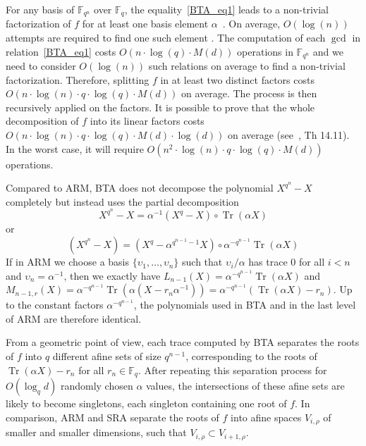 \documentclass{sig-alternate}
\newcommand{\ff}[1]{\mathbb{F}_{#1}}
\newcommand{\fq}{\ff{q}}
\newcommand{\dd}{d}
\newcommand{\qq}{q}
\newcommand{\nn}{n}
\newcommand{\qn}{{\qq^\nn}}
\newcommand{\basef}{\ff{\qq}}
\newcommand{\extf}{\ff{\qn}}
\DeclareMathOperator{\Tr}{Tr}
\newcommand{\bigO}{O}
\newcounter{algo}
\newtheorem{Lem}{Lemma}
\begin{document}
%
For any basis of $\extf$ over $\basef$, the equality~\eqref{BTA_eq1} leads to a non-trivial factorization of $f$ for at least one basis element $\alpha$~\cite{berl70}.
% 
On average, $\bigO(\log(\nn))$ attempts are required to find one such element \cite{Menvanovans92}. The computation of each $\gcd$ in relation~\eqref{BTA_eq1} costs $\bigO(\nn \cdot \log(\qq) \cdot M(\dd))$ operations in $\extf$ and we need to consider $\bigO(\log(n))$ such relations on average to find a non-trivial factorization. Therefore, 
splitting $f$ in at least two distinct factors costs $\bigO(n \cdot \log(n) \cdot  q \cdot \log(q) \cdot M(d))$ on average. The process is then recursively applied on the factors. It is possible to prove that the whole decomposition of $f$ into its linear factors costs $\bigO(n  \cdot \log(n) \cdot q \cdot \log(q) \cdot M(d) \cdot \log(d))$ on average (see~\cite{Gathen2003}, Th 14.11). In the worst case, it will require $\bigO(n^2 \cdot \log(n) \cdot q \cdot \log(q) \cdot M(d) )$ operations.


Compared to ARM, BTA does not decompose the polynomial $X^{\qq^\nn}-X$ completely but instead uses the partial decomposition
$$X^{\qq^\nn}-X=\alpha^{-1}(X^\qq- X)\circ\Tr(\alpha X)$$
or
$$(X^{q^n}-X) = (X^q- \alpha^{q^{n-1}-1} X)  \circ \alpha^{-q^{n-1}}\Tr(\alpha X)$$
If in ARM we choose a basis $\{\upsilon_1,\ldots,\upsilon_{\nn}\}$ such that $\upsilon_i/\alpha$ has trace 0 for all $i<\nn$ and $\upsilon_\nn=\alpha^{-1}$, then we exactly have $L_{\nn-1}(X)=\alpha^{-q^{n-1}}\Tr(\alpha X)$ and $M_{\nn-1,r}(X)=\alpha^{-q^{n-1}}\Tr(\alpha (X-r_\nn\alpha^{-1}))=\alpha^{-q^{n-1}}\left(\Tr(\alpha X)-r_\nn\right)$. Up to the constant factors $\alpha^{-q^{n-1}}$, the polynomials used in BTA and in the last level of ARM are therefore identical.

From a geometric point of view, each trace computed by BTA separates the roots of $f$ into $q$ different afine sets of size $\qq^{\nn-1}$, corresponding to the roots of $\Tr(\alpha X)-r_\nn$ for all $r_\nn\in\fq$. After repeating this separation process for $O(\log_\qq\dd)$  randomly chosen $\alpha$ values, the intersections of these afine sets are likely to become singletons, each singleton containing one root of $f$. 
%
In comparison, ARM and SRA separate the roots of $f$ into afine spaces $V_{i,\rho}$ of smaller and smaller dimensions, such that $V_{i,\rho}\subset V_{i+1,\rho}$. 
\end{document}
